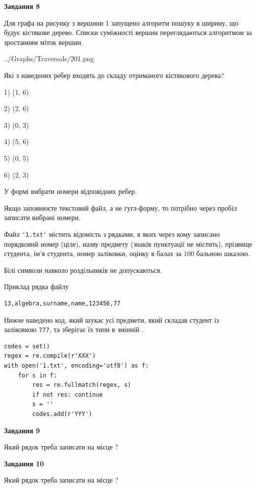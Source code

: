 \documentclass[12pt, ukrainian]{article}
\def\code#1{\Verb!#1!}
\begin{document}
{\begin {large}
{\begin {center}\textbf{Завдання 8}\end {center}}\par
Для графа на рисунку з вершини 1 запущено алгоритм пошуку в ширину, що будує кістякове дерево. Списки суміжності вершин переглядаються алгоритмом за зростанням міток вершин.\par
\begin{center}
	{../Graphs/Traversals/201.png}
\end{center}
\par Які з наведених ребер входять до складу отриманого кістякового дерева?\par
1) (1, 6)\par
2) (2, 6)\par
3) (0, 3)\par
4) (5, 6)\par
5) (0, 5)\par
6) (2, 3)\par
{\vskip 15pt} У формі вибрати номери відповідних ребер.


Якщо заповнюєте текстовий файл, а не гугл-форму, то потрібно через пробіл записа\-ти вибрані номери.\par
\newpage


Файл \code{'1.txt'} містить відомість з рядками, в яких через кому записано поряд\-ковий номер (ціле), назву предмету (знаків пунктуації не містить), прізвище студента, ім'я студента, номер заліковки, оцінку в балах за 100 бальною шкалою.

Білі символи навколо роздільників не допускаються.

Приклад рядка файлу



\begin{verbatim}
13,algebra,surname,name,123456,77
\end{verbatim}


Нижче наведено код, який шукає усі предмети, який складав студент із заліковкою \code{777}, та зберігає їх типи в змінній .



\begin{verbatim}
codes = set()
regex = re.compile(r'XXX')
with open('1.txt', encoding='utf8') as f:
    for s in f:
        res = re.fullmatch(regex, s)
        if not res: continue
        s = ''
        codes.add(r'YYY')
\end{verbatim}


{\begin {center}\textbf{Завдання 9}\end {center}}\par
Який рядок треба записати на місце  ?\par
\vspace{5mm}


{\begin {center}\textbf{Завдання 10}\end {center}}\par
Який рядок треба записати на місце  ?\par


\newpage


\end {large}}
\end{document}
